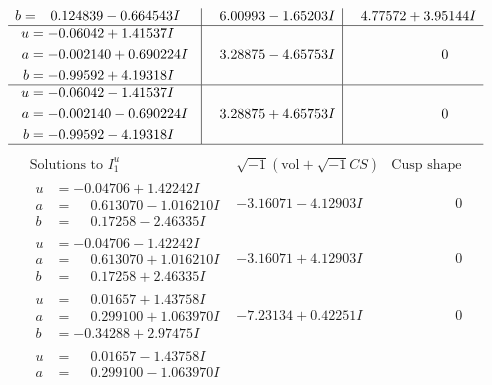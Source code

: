 \documentclass[1p]{elsarticle_modified}
\theoremstyle{definition}
\newcommand{\I}{\sqrt{-1}}
\begin{document}
$$\begin{array}{c|c|c}
\begin{aligned}
b &= \phantom{-}0.124839 - 0.664543 I\end{aligned}
 & \phantom{-}6.00993 - 1.65203 I & \phantom{-}4.77572 + 3.95144 I \\ \hline\begin{aligned}
u &= -0.06042 + 1.41537 I \\
a &= -0.002140 + 0.690224 I \\
b &= -0.99592 + 4.19318 I\end{aligned}
 & \phantom{-}3.28875 - 4.65753 I & \phantom{-0.000000 } 0 \\ \hline\begin{aligned}
u &= -0.06042 - 1.41537 I \\
a &= -0.002140 - 0.690224 I \\
b &= -0.99592 - 4.19318 I\end{aligned}
 & \phantom{-}3.28875 + 4.65753 I & \phantom{-0.000000 } 0\\
 \hline 
 \end{array}$$\newpage$$\begin{array}{c|c|c}  
\text{Solutions to }I^u_{1}& \I (\text{vol} + \sqrt{-1}CS) & \text{Cusp shape}\\
 \hline 
\begin{aligned}
u &= -0.04706 + 1.42242 I \\
a &= \phantom{-}0.613070 - 1.016210 I \\
b &= \phantom{-}0.17258 - 2.46335 I\end{aligned}
 & -3.16071 - 4.12903 I & \phantom{-0.000000 } 0 \\ \hline\begin{aligned}
u &= -0.04706 - 1.42242 I \\
a &= \phantom{-}0.613070 + 1.016210 I \\
b &= \phantom{-}0.17258 + 2.46335 I\end{aligned}
 & -3.16071 + 4.12903 I & \phantom{-0.000000 } 0 \\ \hline\begin{aligned}
u &= \phantom{-}0.01657 + 1.43758 I \\
a &= \phantom{-}0.299100 + 1.063970 I \\
b &= -0.34288 + 2.97475 I\end{aligned}
 & -7.23134 + 0.42251 I & \phantom{-0.000000 } 0 \\ \hline\begin{aligned}
u &= \phantom{-}0.01657 - 1.43758 I \\
a &= \phantom{-}0.299100 - 1.063970 I \\

\end{aligned}
\end{array}$$
\end{document}
